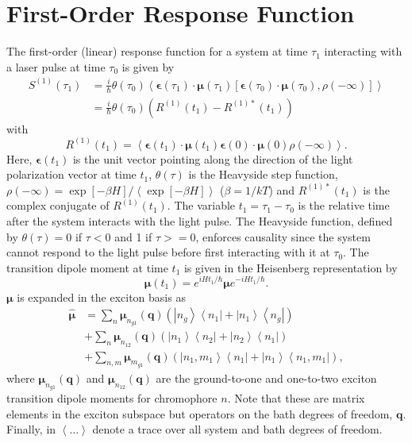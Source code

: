 \documentclass{article}
\newcommand{\bra}[1]{\ensuremath{\left\langle#1\right|}}
\newcommand{\ket}[1]{\ensuremath{\left|#1\right\rangle}}
\newcommand{\ensb}[1]{\left\langle#1\right\rangle}
\newcommand{\comm}[2]{\left[#1,#2\right]}
\newcommand{\vect}[1]{\ensuremath{\boldsymbol{\mathbf{#1}}}}
\begin{document}
\section{First-Order Response Function}
The first-order (linear) response function for a system at time $\tau_{1}$ interacting with a laser pulse at time $\tau_{0}$ is given by\cite{Mukamel1995,Hamm2011}
\begin{equation}
\begin{split}
S^{(1)}(\tau_{1})&=\frac{i}{\hbar}\theta(\tau_{0})\ensb{\vect\epsilon(\tau_{1})\cdot\vect\mu(\tau_{1})\comm{\vect\epsilon(\tau_{0})\cdot\vect\mu(\tau_{0})}{\rho(-\infty)}}\\
&=\frac{i}{\hbar}\theta(\tau_{0})\left(R^{(1)}(t_{1})-R^{(1)*}(t_{1})\right)
\end{split}
\end{equation}
with
\begin{equation}
\label{eq:R1}
R^{(1)}(t_{1})=\ensb{\vect\epsilon(t_{1})\cdot\vect\mu(t_{1})\vect\epsilon(0)\cdot\vect\mu(0)\rho(-\infty)}.
\end{equation}
Here, $\vect\epsilon(t_{1})$ is the unit vector pointing along the direction of the light polarization vector at time $t_{1}$, $\theta(\tau)$ is the Heavyside step function, $\rho(-\infty)=\exp[-\beta H]/\ensb{\exp[-\beta H]}$ ($\beta=1/kT$) and $R^{(1)*}(t_{1})$ is the complex conjugate of $R^{(1)}(t_{1})$.
The variable $t_{1}=\tau_{1}-\tau_{0}$ is the relative time after the system interacts with the light pulse.
The Heavyside function, defined by $\theta(\tau)= 0$ if $\tau <0$ and 1 if $\tau>=0$, enforces causality since the system cannot respond to the light pulse before first interacting with it at $\tau_{0}$.
The transition dipole moment at time $t_{1}$ is given in the Heisenberg representation by
\begin{equation}
\vect\mu(t_{1})=e^{iHt_{1}/\hbar}\vect\mu e^{-iHt_{1}/\hbar}.
\end{equation}
$\vect{\mu}$ is expanded in the exciton basis as
\begin{equation}
\begin{split}
\hat{\vect{\mu}}&=\sum_{n}\vect\mu_{n_{g1}}(\vect q)\left(\ket{n_{g}}\bra{n_{1}}+\ket{n_{1}}\bra{n_{g}}\right)\\
		&+\sum_{n}\vect\mu_{n_{12}}(\vect q)\left(\ket{n_{1}}\bra{n_{2}}+\ket{n_{2}}\bra{n_{1}}\right)\\
		&+\sum_{n,m}\vect\mu_{m_{g1}}(\vect q)\left(\ket{n_{1},m_{1}}\bra{n_{1}}+\ket{n_{1}}\bra{n_{1},m_{1}}\right),
\end{split}
\end{equation}
where $\vect\mu_{n_{g1}}(\vect q)$ and $\vect\mu_{n_{12}} (\vect q)$ are the ground-to-one and one-to-two exciton transition dipole moments for chromophore $n$.
Note that these are matrix elements in the exciton subspace but operators on the bath degrees of freedom, \vect{q}.
Finally, in  $\left\langle \ldots \right\rangle$ denote a trace over all system and bath degrees of freedom.
\end{document}
